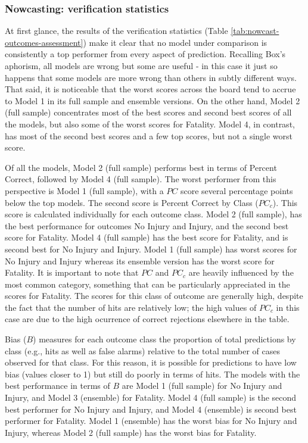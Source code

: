 \documentclass[]{elsarticle} %
\begin{document}
\hypertarget{nowcasting-verification-statistics}{%
\subsubsection{Nowcasting: verification
statistics}\label{nowcasting-verification-statistics}}

At first glance, the results of the verification statistics (Table
\ref{tab:nowcast-outcomes-assessment}) make it clear that no model under
comparison is consistently a top performer from every aspect of
prediction. Recalling Box's aphorism, all models are wrong but some are
useful - in this case it just so happens that some models are more wrong
than others in subtly different ways. That said, it is noticeable that
the worst scores across the board tend to accrue to Model 1 in its full
sample and ensemble versions. On the other hand, Model 2 (full sample)
concentrates most of the best scores and second best scores of all the
models, but also some of the worst scores for Fatality. Model 4, in
contrast, has most of the second best scores and a few top scores, but
not a single worst score.

Of all the models, Model 2 (full sample) performs best in terms of
Percent Correct, followed by Model 4 (full sample). The worst performer
from this perspective is Model 1 (full sample), with a \(PC\) score
several percentage points below the top models. The second score is
Percent Correct by Class (\(PC_c\)). This score is calculated
individually for each outcome class. Model 2 (full sample), has the best
performance for outcomes No Injury and Injury, and the second best score
for Fatality. Model 4 (full sample) has the best score for Fatality, and
is second best for No Injury and Injury. Model 1 (full sample) has worst
scores for No Injury and Injury whereas its ensemble version has the
worst score for Fatality. It is important to note that \(PC\) and
\(PC_c\) are heavily influenced by the most common category, something
that can be particularly appreciated in the scores for Fatality. The
scores for this class of outcome are generally high, despite the fact
that the number of hits are relatively low; the high values of \(PC_c\)
in this case are due to the high ocurrence of correct rejections
elsewhere in the table.

Bias (\(B\)) measures for each outcome class the proportion of total
predictions by class (e.g., hits as well as false alarms) relative to
the total number of cases observed for that class. For this reason, it
is possible for predictions to have low bias (values closer to 1) but
still do poorly in terms of hits. The models with the best performance
in terms of \(B\) are Model 1 (full sample) for No Injury and Injury,
and Model 3 (ensemble) for Fatality. Model 4 (full sample) is the second
best performer for No Injury and Injury, and Model 4 (ensemble) is
second best performer for Fatality. Model 1 (ensemble) has the worst
bias for No Injury and Injury, whereas Model 2 (full sample) has the
worst bias for Fatality.
\end{document}
